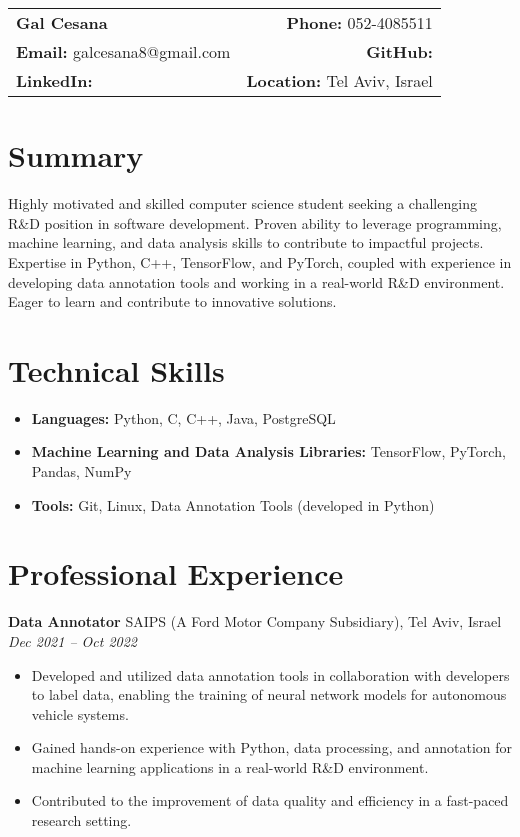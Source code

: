 \documentclass[a4paper,10pt]{article}
\makeatletter
\renewcommand{\maketitle}{
    \hspace{-1em}\begin{tabular*}{\textwidth}{l@{\extracolsep{\fill}}r}
        \textbf{\LARGE Gal Cesana} & \textbf{Phone:} 052-4085511 \\
        \textbf{Email:} galcesana8@gmail.com & \textbf{GitHub:}  \\
        \textbf{LinkedIn:}  & \textbf{Location:} Tel Aviv, Israel \\
    \end{tabular*}
    \vspace{1em}
}
\makeatother
\begin{document}
\maketitle

\section*{Summary}
Highly motivated and skilled computer science student seeking a challenging R\&D position in software development. Proven ability to leverage programming, machine learning, and data analysis skills to contribute to impactful projects. Expertise in Python, C++, TensorFlow, and PyTorch, coupled with experience in developing data annotation tools and working in a real-world R\&D environment. Eager to learn and contribute to innovative solutions. 

\section*{Technical Skills}
\begin{itemize}[noitemsep,nolistsep]
    \item \textbf{Languages:} Python, C, C++, Java, PostgreSQL
    \item \textbf{Machine Learning and Data Analysis Libraries:} TensorFlow, PyTorch, Pandas, NumPy
    \item \textbf{Tools:} Git, Linux, Data Annotation Tools (developed in Python)
\end{itemize}

\section*{Professional Experience}
\textbf{Data Annotator} \hfill SAIPS (A Ford Motor Company Subsidiary), Tel Aviv, Israel \\
\textit{Dec 2021 -- Oct 2022}
\begin{itemize}[noitemsep,nolistsep]
    \item Developed and utilized data annotation tools in collaboration with developers to label data, enabling the training of neural network models for autonomous vehicle systems.
    \item Gained hands-on experience with Python, data processing, and annotation for machine learning applications in a real-world R\&D environment.
    \item Contributed to the improvement of data quality and efficiency in a fast-paced research setting.
\end{itemize}
\end{document}

